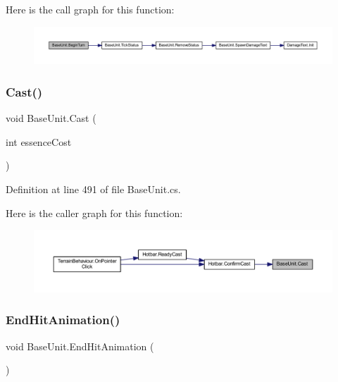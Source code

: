 Here is the call graph for this function\+:
\nopagebreak
\begin{figure}[H]
\begin{center}
\leavevmode
\includegraphics[width=350pt]{class_base_unit_a0f8955c72dfa02027c1b247d74233f0d_cgraph}
\end{center}
\end{figure}
\mbox{\label{class_base_unit_a5fb838313b1a61dbf38d440c2a12667e}} 
\subsubsection{\texorpdfstring{Cast()}{Cast()}}
{\footnotesize\ttfamily void Base\+Unit.\+Cast (\begin{DoxyParamCaption}\item[{int}]{essence\+Cost }\end{DoxyParamCaption})}



Definition at line 491 of file Base\+Unit.\+cs.

Here is the caller graph for this function\+:
\nopagebreak
\begin{figure}[H]
\begin{center}
\leavevmode
\includegraphics[width=350pt]{class_base_unit_a5fb838313b1a61dbf38d440c2a12667e_icgraph}
\end{center}
\end{figure}
\mbox{\label{class_base_unit_ac451e0e35631687d8a40a20ce68e0e51}} 
\subsubsection{\texorpdfstring{EndHitAnimation()}{EndHitAnimation()}}
{\footnotesize\ttfamily void Base\+Unit.\+End\+Hit\+Animation (\begin{DoxyParamCaption}{ }\end{DoxyParamCaption})}



